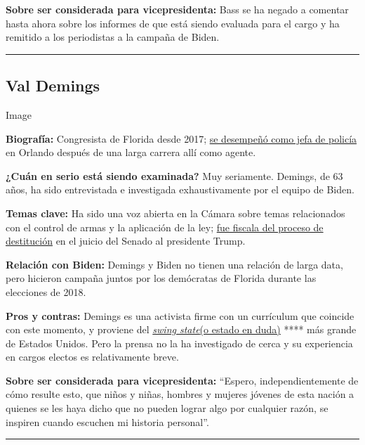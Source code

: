 \textbf{Sobre ser considerada para vicepresidenta:} Bass se ha negado a
comentar hasta ahora sobre los informes de que está siendo evaluada para
el cargo y ha remitido a los periodistas a la campaña de Biden.

\begin{center}\rule{0.5\linewidth}{\linethickness}\end{center}

\hypertarget{val-demings}{%
\subsection{Val Demings}\label{val-demings}}

Image

\textbf{Biografía:} Congresista de Florida desde 2017;
\href{https://www.nytimes.com/2020/01/15/us/politics/who-is-val-demings.html}{se
desempeñó como jefa de policía} en Orlando después de una larga carrera
allí como agente.

\textbf{¿Cuán en serio está siendo examinada?} Muy seriamente. Demings,
de 63 años, ha sido entrevistada e investigada exhaustivamente por el
equipo de Biden.

\textbf{Temas clave:} Ha sido una voz abierta en la Cámara sobre temas
relacionados con el control de armas y la aplicación de la ley;
\href{https://www.nytimes.com/2020/01/15/us/politics/impeachment-briefing-meet-the-managers.html}{fue
fiscala del proceso de destitución} en el juicio del Senado al
presidente Trump.

\textbf{Relación con Biden:} Demings y Biden no tienen una relación de
larga data, pero hicieron campaña juntos por los demócratas de Florida
durante las elecciones de 2018.

\textbf{Pros y contras:} Demings es una activista firme con un
currículum que coincide con este momento, y proviene del
\href{https://www.bbc.com/mundo/noticias-internacional-37784288}{\emph{swing
state}}\href{https://www.bbc.com/mundo/noticias-internacional-37784288}{(o
estado en duda)} **** más grande de Estados Unidos. Pero la prensa no la
ha investigado de cerca y su experiencia en cargos electos es
relativamente breve.

\textbf{Sobre ser considerada para vicepresidenta:} ``Espero,
independientemente de cómo resulte esto, que niños y niñas, hombres y
mujeres jóvenes de esta nación a quienes se les haya dicho que no pueden
lograr algo por cualquier razón, se inspiren cuando escuchen mi historia
personal''.

\begin{center}\rule{0.5\linewidth}{\linethickness}\end{center}

